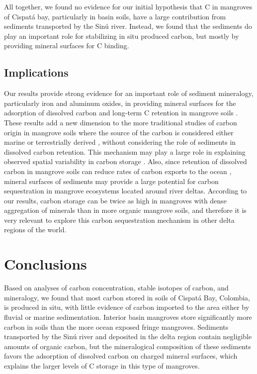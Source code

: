 All together, we found no evidence for our initial hypothesis that C in mangroves of Cispat\'a bay, particularly in basin soils, have a large contribution from sediments transported by the Sin\'u river. Instead, we found that the sediments do play an important role for stabilizing in situ produced carbon, but mostly by providing mineral surfaces for C binding. 

\subsection{Implications}
Our results provide strong evidence for an important role of sediment mineralogy, particularly iron and aluminum oxides, in providing mineral surfaces for the adsorption of dissolved carbon and long-term C retention \citep{Oades1988} in mangrove soils . These results add a new dimension to the more traditional studies of carbon origin in mangrove soils where the source of the carbon is considered either marine or terrestrially derived \citep{lacerda, Bouillion}, without considering the role of sediments in dissolved carbon retention. This mechanism may play a large role in explaining observed spatial variability in carbon storage \citep{Alongi2012, Jardine2014}. Also, since retention of dissolved carbon in mangrove soils can reduce rates of carbon exports to the ocean \citep{Adame2011}, mineral surfaces of sediments may provide a large potential for carbon sequestration in mangrove ecosystems located around river deltas. According to our results, carbon storage can be twice as high in mangroves with dense aggregation of minerals than in more organic mangrove soils, and therefore it is very relevant to explore this carbon sequestration mechanism in other delta regions of the world. 

\section{Conclusions}
Based on analyses of carbon concentration, stable isotopes of carbon, and mineralogy, we found that most carbon stored in soils of Cispat\'a Bay, Colombia, is produced in situ, with little evidence of carbon imported to the area either by fluvial or marine sedimentation. Interior basin mangroves store significantly more carbon in soils than the more ocean exposed fringe mangroves. Sediments transported by the Sin\'u river and deposited in the delta region contain negligible amounts of organic carbon, but the mineralogical composition of these sediments favors the adsorption of dissolved carbon on charged mineral surfaces, which explains the larger levels of C storage in this type of mangroves. 

